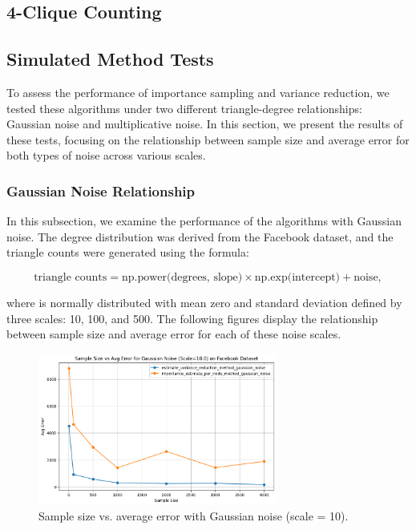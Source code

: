 \documentclass[11pt]{article}
\begin{document}
\subsection{}

\subsection{4-Clique Counting}

\subsection{Simulated Method Tests}

To assess the performance of importance sampling and variance reduction, we tested these algorithms under two different triangle-degree relationships: Gaussian noise and multiplicative noise. In this section, we present the results of these tests, focusing on the relationship between sample size and average error for both types of noise across various scales.

\subsubsection{Gaussian Noise Relationship}

In this subsection, we examine the performance of the algorithms with Gaussian noise. The degree distribution was derived from the Facebook dataset, and the triangle counts were generated using the formula:

\[
\text{triangle counts} = \text{np.power(degrees, slope)} \times \text{np.exp(intercept)} + \text{noise},
\]

where  is normally distributed with mean zero and standard deviation defined by three scales: 10, 100, and 500. The following figures display the relationship between sample size and average error for each of these noise scales.

\begin{figure}[h!]
    \centering
    \includegraphics[width=0.7\textwidth]{plots/simulated/percent_error_vs_sample_size_comparison_gaussian_10.0.png}
    \caption{Sample size vs. average error with Gaussian noise (scale = 10).}
    \label{fig:gaussian_noise_10}
\end{figure}
\end{document}
